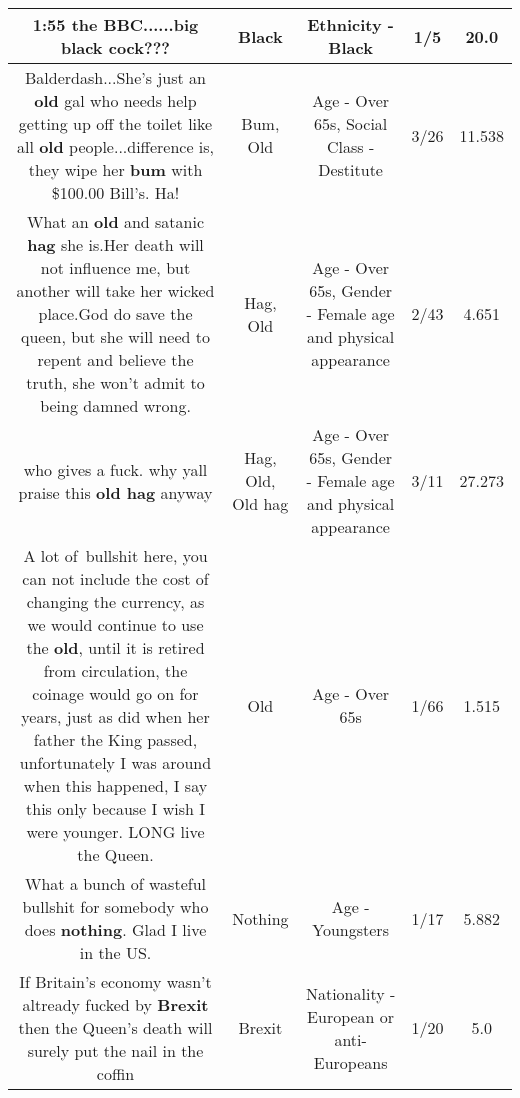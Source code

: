 \documentclass[11pt]{article}
\newlength\mylength
\begin{document}
\begin{center}
\begin{longtable}{|C{.65\mylength}|C{.30\mylength}|C{.12\mylength}|C{.12\mylength}|C{.12\mylength}|}
  \small 1:55 the BBC......big \textbf{black} cock???\normalsize   & Black & Ethnicity - Black & 1/5 & 20.0 \\  \hline
  \small Balderdash...She's just an \textbf{old} gal who needs help getting up off the toilet like all \textbf{old} people...difference is, they wipe her \textbf{bum} with \$100.00 Bill's.  Ha!\normalsize   & Bum, Old & Age - Over 65s, Social Class - Destitute & 3/26 & 11.538 \\  \hline
  \small What an \textbf{old} and satanic \textbf{hag} she is.Her death will not influence me, but another will take her wicked place.God do save the queen, but she will need to repent and believe the truth, she won't admit to being damned wrong.\normalsize   & Hag, Old & Age - Over 65s, Gender - Female age and physical appearance & 2/43 & 4.651 \\  \hline
  \small who gives a fuck. why yall praise this \textbf{o\textbf{ld} h\textbf{ag}} anyway\normalsize   & Hag, Old, Old hag & Age - Over 65s, Gender - Female age and physical appearance & 3/11 & 27.273 \\  \hline
  \small A lot of bullshit here, you can not include the cost of changing the currency, as we would continue to use the \textbf{old}, until it is retired from circulation, the coinage would go on for years, just as did when her father the King passed, unfortunately I was around when this happened, I say this only because I wish I were younger. LONG live the Queen.\normalsize   & Old & Age - Over 65s & 1/66 & 1.515 \\  \hline
  \small What a bunch of wasteful bullshit for somebody who does \textbf{nothing}. Glad I live in the US.\normalsize   & Nothing & Age - Youngsters & 1/17 & 5.882 \\  \hline
  \small If Britain's economy wasn't altready fucked by \textbf{Brexit} then the Queen's death will surely put the nail in the coffin\normalsize   & Brexit & Nationality - European or anti-Europeans & 1/20 & 5.0 \\  \hline

\end{longtable}
\end{center}
\end{document}

